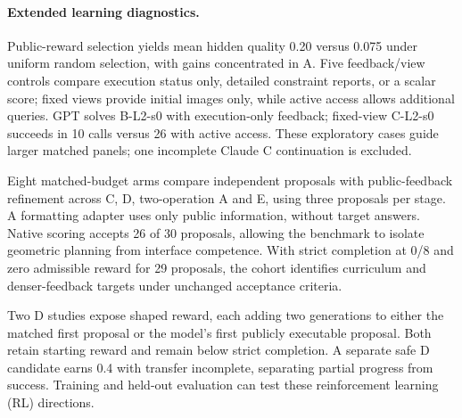 \paragraph{Extended learning diagnostics.}
Public-reward selection yields mean hidden quality 0.20 versus 0.075 under uniform random selection, with gains concentrated in A. Five feedback/view controls compare execution status only, detailed constraint reports, or a scalar score; fixed views provide initial images only, while active access allows additional queries. GPT solves B-L2-s0 with execution-only feedback; fixed-view C-L2-s0 succeeds in 10 calls versus 26 with active access. These exploratory cases guide larger matched panels; one incomplete Claude C continuation is excluded.

Eight matched-budget arms compare independent proposals with public-feedback refinement across C, D, two-operation A and E, using three proposals per stage. A formatting adapter uses only public information, without target answers. Native scoring accepts 26 of 30 proposals, allowing the benchmark to isolate geometric planning from interface competence. With strict completion at 0/8 and zero admissible reward for 29 proposals, the cohort identifies curriculum and denser-feedback targets under unchanged acceptance criteria.

Two D studies expose shaped reward, each adding two generations to either the matched first proposal or the model's first publicly executable proposal. Both retain starting reward and remain below strict completion. A separate safe D candidate earns 0.4 with transfer incomplete, separating partial progress from success. Training and held-out evaluation can test these reinforcement learning (RL) directions.
